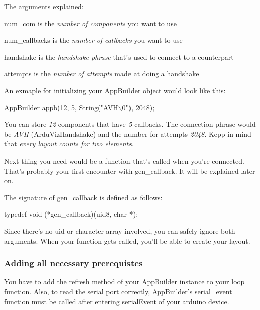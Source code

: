 The arguments explained\+:
\begin{DoxyItemize}
\item {\ttfamily num\+\_\+com} is the {\itshape number of components} you want to use
\item {\ttfamily num\+\_\+callbacks} is the {\itshape number of callbacks} you want to use
\item {\ttfamily handshake} is the {\itshape handshake phrase} that's used to connect to a counterpart
\item {\ttfamily attempts} is the {\itshape number of attempts} made at doing a handshake
\end{DoxyItemize}

An exmaple for initializing your \hyperlink{class_app_builder}{App\+Builder} object would look like this\+:


\begin{DoxyCode}
\hyperlink{class_app_builder}{AppBuilder} appb(12, 5, String(\textcolor{stringliteral}{"AVH\(\backslash\)0"}), 2048);
\end{DoxyCode}


You can store {\itshape 12} components that have {\itshape 5} callbacks. The connection phrase would be {\itshape A\+V\+H} (Ardu\+Viz\+Handshake) and the number for attempts {\itshape 2048}. Kepp in mind that {\itshape every layout counts for two elements}.

Next thing you need would be a function that's called when you're connected. That's probably your first encounter with {\ttfamily gen\+\_\+callback}. It will be explained later on.

The signature of {\ttfamily gen\+\_\+callback} is defined as follows\+: 
\begin{DoxyCode}
\textcolor{keyword}{typedef} void (*gen\_callback)(uid8, \textcolor{keywordtype}{char} *);
\end{DoxyCode}


Since there's no uid or character array involved, you can safely ignore both arguments. When your function gets called, you'll be able to create your layout.

\subsubsection*{Adding all necessary prerequistes}

You have to add the {\ttfamily refresh} method of your \hyperlink{class_app_builder}{App\+Builder} instance to your {\ttfamily loop} function. Also, to read the serial port correctly, \hyperlink{class_app_builder}{App\+Builder}'s {\ttfamily serial\+\_\+event} function must be called after entering {\ttfamily serial\+Event} of your arduino device.

